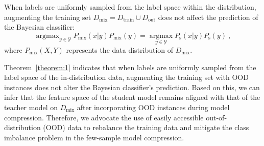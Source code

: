 \documentclass[twoside,11pt]{article}
\begin{document}

 

\begin{theorem}
\label{theorem:1}
When labels are uniformly sampled from the label space within the distribution, augmenting the training set $D_{\mathrm{mix}} = D_{\mathrm{train}} \cup D_{\mathrm{out}}$ does not affect the prediction of the Bayesian classifier:
\begin{equation}
\mathop{\arg\max}_{y \in \mathcal{Y}} P_{\mathrm{mix}}(x|y) P_{\mathrm{mix}}(y) = \mathop{\arg\max}\limits_{y \in \mathcal{Y}} P_{\mathrm{s}}(x|y) P_{\mathrm{s}}(y)\ ,
\end{equation}
where $P_{\mathrm{mix}}(X, Y)$ represents the data distribution of $D_{\mathrm{mix}}$.    
\end{theorem}

Theorem~\ref{theorem:1} indicates that when labels are uniformly sampled from the label space of the in-distribution data, augmenting the training set with OOD instances does not alter the Bayesian classifier's prediction. Based on this, we can infer that the feature space of the student model remains aligned with that of the teacher model on $D_{\mathrm{mix}}$ after incorporating OOD instances during model compression. Therefore, we advocate the use of easily accessible out-of-distribution (OOD) data to rebalance the training data and mitigate the class imbalance problem in the few-sample model compression.
\end{document}
